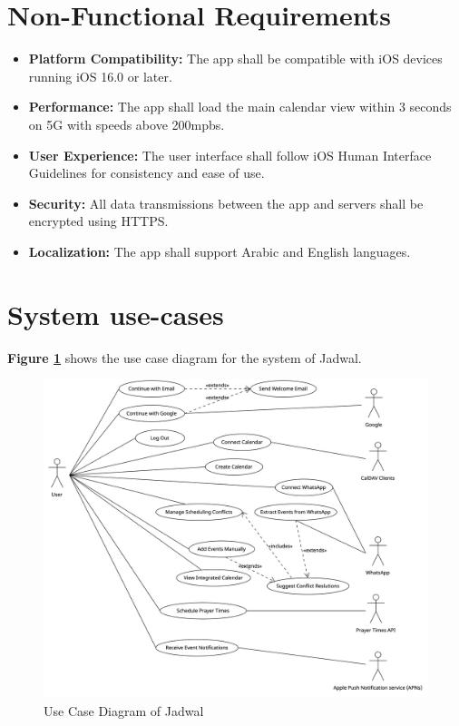\documentclass[12pt,a4paper]{report}
\begin{document}
\newpage

\section{Non-Functional Requirements}

\begin{itemize}
    \item \textbf{Platform Compatibility:} The app shall be compatible with iOS devices running iOS 16.0 or later.
    \item \textbf{Performance:} The app shall load the main calendar view within 3 seconds on 5G with speeds above 200mpbs.
    \item \textbf{User Experience:} The user interface shall follow iOS Human Interface Guidelines for consistency and ease of use.
    \item \textbf{Security:} All data transmissions between the app and servers shall be encrypted using HTTPS.
    \item \textbf{Localization:} The app shall support Arabic and English languages.
\end{itemize}
\newpage
\section{System use-cases}
   
\textbf{Figure \ref{fig:use-case-diagram}} shows the use case diagram for the system of Jadwal.

\begin{figure}[!h]
    \centering
    \includegraphics[width=\textwidth]{images/use-case-diagram.png}
    \caption{Use Case Diagram of Jadwal}
    \label{fig:use-case-diagram}
\end{figure}
\end{document}
